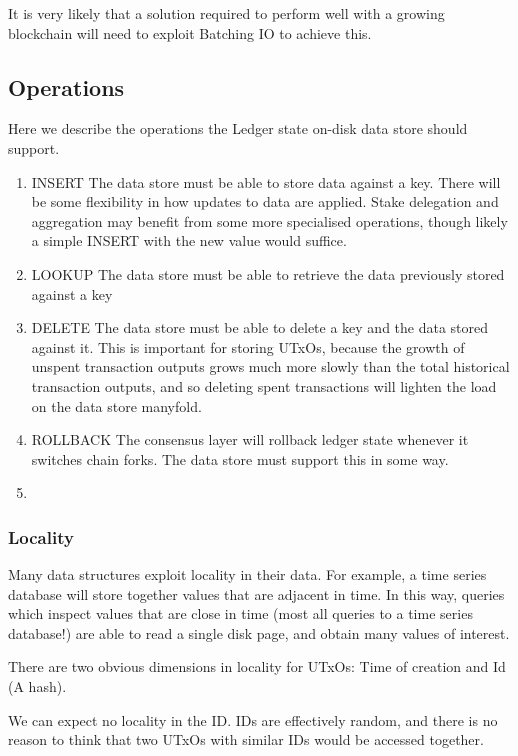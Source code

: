 \documentclass[11pt,a4paper]{article}
\begin{document}
It is very likely that a solution required to perform well with a growing
blockchain will need to exploit Batching IO to achieve this.

\subsection{Operations}
\label{Operations}
Here we describe the operations the Ledger state on-disk data store should
support.

\begin{enumerate}
  \item INSERT
        The data store must be able to store data against a key. There will be
        some flexibility in how updates to data are applied. Stake delegation
        and aggregation may benefit from some more specialised operations,
        though likely a simple INSERT with the new value would suffice.
  \item LOOKUP
        The data store must be able to retrieve the data previously stored
        against a key
  \item DELETE
        The data store must be able to delete a key and the data stored against
        it. This is important for storing UTxOs, because the growth of unspent
        transaction outputs grows much more slowly than the total historical
        transaction outputs, and so deleting spent transactions will lighten the
        load on the data store manyfold.
  \item ROLLBACK
        \label{ROLLBACK}
        The consensus layer will rollback ledger state whenever it switches
        chain forks. The data store must support this in some way.
  \item

\end{enumerate}

\subsubsection{Locality}
\label{Locality}
Many data structures exploit locality in their data. For example, a time series database will store together values that are adjacent in time. In this way, queries which inspect values that are close in time (most all queries to a time series database!) are able to read a single disk page, and obtain many values of interest.

There are two obvious dimensions in locality for UTxOs: Time of creation and Id (A hash).

We can expect no locality in the ID. IDs are effectively random, and there is no reason to think that two UTxOs with similar IDs would be accessed together.
\end{document}
